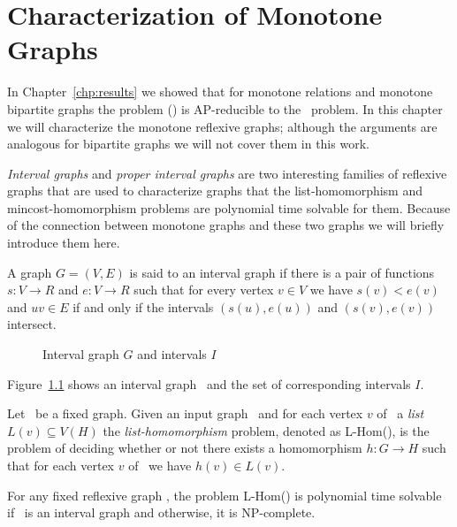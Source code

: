 \chapter{Characterization of Monotone Graphs}
In Chapter~\ref{chp:results} we showed that for monotone relations and monotone
bipartite graphs the problem \ccsp(\mH) is AP-reducible to the \cbis\ problem. In this chapter we will
characterize the monotone reflexive graphs; although the arguments are
analogous for bipartite graphs we will not cover them in this work.

\emph{Interval graphs} and \emph{proper interval graphs}
are two interesting families of reflexive graphs that are used to characterize graphs that the
list-homomorphism and mincost-homomorphism problems are polynomial time solvable for them.
Because of the connection between monotone graphs and these two graphs we will briefly introduce them
here.

\begin{defi}
A graph \(G=(V,E)\) is said to an interval graph if there is a pair of functions
\(s:V\to R\) and \(e: V\to R\) such that for every vertex \(v \in V\) 
we have \(s(v) < e(v)\) and \(uv \in E\) if and only if the intervals
\((s(u),e(u))\) and \((s(v),e(v))\) intersect.
\end{defi}

\begin{figure}
\center
\caption{Interval graph \ensuremath{G} and intervals \ensuremath{I}}
\label{fig:intv}
\end{figure}

Figure~\ref{fig:intv} shows an interval graph \mG\ and the set of 
corresponding intervals \(I\)\@.

\begin{defi} [L-Hom]
Let \mH\ be a fixed graph. Given an input graph \mG\ and for each vertex \(v\) of \mG\
a \emph{list} \(L(v) \subseteq V(H)\) the \emph{list-homomorphism} problem, denoted
as L-Hom(\mH), is the problem of  deciding whether or not
there exists a homomorphism \(h: G\to H\) such that for each vertex \(v\) of \mG\ 
we have \(h(v)\in L(v)\)\@.
\end{defi}

\begin{theorem} [Feder and Hell 1996 \cite{listhom}] \label{thm:lhom}
For any fixed reflexive graph \mH, the problem L-Hom(\mH) is polynomial time solvable if
\mH\ is an interval graph and otherwise, it is NP-complete.
\end{theorem}

